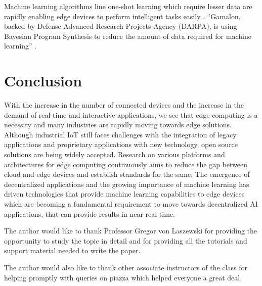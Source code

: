 \documentclass[sigconf]{acmart}
\begin{document}
Machine learning algorithms line one-shot learning which require lesser data are rapidly enabling edge devices to perform intelligent tasks easily \cite{wiki-one-shot-learning}.
``Gamalon, backed by Defense Advanced Research Projects Agency (DARPA), is using Bayesian Program Synthesis to reduce the amount of data required for machine learning'' \cite{ai-to-edge}. 

\section{Conclusion}
With the increase in the number of connected devices and the increase in the demand of real-time and interactive applications, we see that edge computing is a necessity and many industries are rapidly moving towards edge solutions. Although industrial IoT still faces challenges with the integration of legacy applications and proprietary applications with new technology, open source solutions are being widely accepted. Research on various platforms and architectures for edge computing continuously aims to reduce the gap between cloud and edge devices and establish standards for the same. The emergence of decentralized applications and the growing importance of machine learning has driven technologies that provide machine learning capabilities to edge devices which are becoming a fundamental requirement to move towards decentralized AI applications, that can provide results in near real time.

\begin{acks}
The author would like to thank Professor Gregor von Laszewski for providing the opportunity to study the topic in detail and for providing all the tutorials and support material needed to write the paper.

The author would also like to thank other associate instructors of the class for helping promptly with queries on piazza which helped everyone a great deal.
\end{acks}


 
\end{document}
